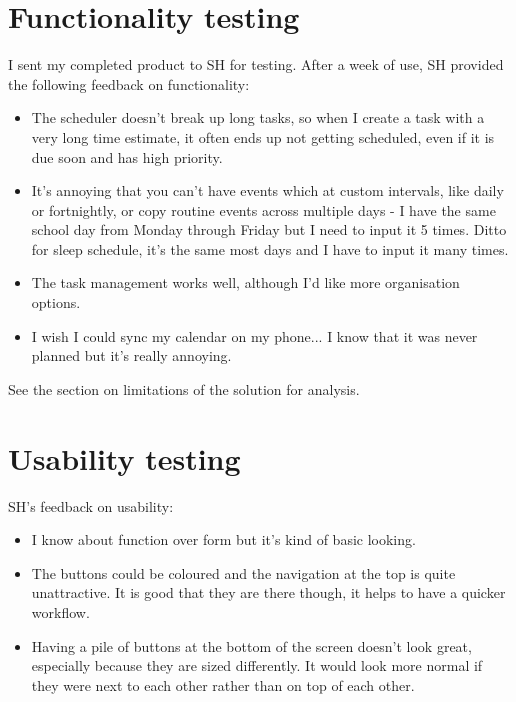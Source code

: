 \documentclass{article}
\begin{document}
\section{Functionality testing}
I sent my completed product to SH for testing.
After a week of use,
SH provided the following feedback on functionality:
\begin{samepage}
	\begin{itemize}
		\item The scheduler doesn't break up long tasks,
		      so when I create a task with a very long time estimate,
		      it often ends up not getting scheduled,
		      even if it is due soon and has high priority.
      \item It's annoying that you can't have events which at custom intervals,
        like daily or fortnightly,
        or copy routine events across multiple days -
        I have the same school day from Monday through Friday but I need to input it 5 times.
        Ditto for sleep schedule, it's the same most days and I have to input it many times.
      \item The task management works well,
        although I'd like more organisation options.
      \item I wish I could sync my calendar on my phone...
        I know that it was never planned but it's really annoying.
	\end{itemize}
\end{samepage}

See the section on limitations of the solution for analysis.

\section{Usability testing}
SH's feedback on usability:
\begin{samepage}
  \begin{itemize}
    \item I know about function over form but it's kind of basic looking.
    \item The buttons could be coloured and the navigation at the top is quite unattractive.
      It is good that they are there though,
      it helps to have a quicker workflow.
    \item Having a pile of buttons at the bottom of the screen doesn't look great,
      especially because they are sized differently.
      It would look more normal if they were next to each other rather than on top of each other.
  \end{itemize}
\end{samepage}
\end{document}
